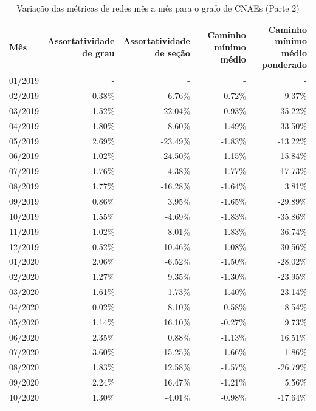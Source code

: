 \begin{table}[htb]
\centering
\caption{Variação das métricas de redes mês a mês para o grafo de CNAEs (Parte 2)}
\label{tab:metricas-redes-pandemia:grafo-mensal-por-cnae2}
\begin{tabular}{l|rrrr}
\toprule
Mês & \shortstack{Assortatividade\\de grau} & \shortstack{Assortatividade\\de seção} & \shortstack{Caminho mínimo\\médio} & \shortstack{Caminho mínimo\\médio ponderado} \\
\midrule
01/2019 & - & - & - & - \\
02/2019 &  0.38\% &  -6.76\% & -0.72\% &  -9.37\% \\
03/2019 &  1.52\% & -22.04\% & -0.93\% &  35.22\% \\
04/2019 &  1.80\% &  -8.60\% & -1.49\% &  33.50\% \\
05/2019 &  2.69\% & -23.49\% & -1.83\% & -13.22\% \\
06/2019 &  1.02\% & -24.50\% & -1.15\% & -15.84\% \\
07/2019 &  1.76\% &   4.38\% & -1.77\% & -17.73\% \\
08/2019 &  1.77\% & -16.28\% & -1.64\% &   3.81\% \\
09/2019 &  0.86\% &   3.95\% & -1.65\% & -29.89\% \\
10/2019 &  1.55\% &  -4.69\% & -1.83\% & -35.86\% \\
11/2019 &  1.02\% &  -8.01\% & -1.83\% & -36.74\% \\
12/2019 &  0.52\% & -10.46\% & -1.08\% & -30.56\% \\
01/2020 &  2.06\% &  -6.52\% & -1.50\% & -28.02\% \\
02/2020 &  1.27\% &   9.35\% & -1.30\% & -23.95\% \\
03/2020 &  1.61\% &   1.73\% & -1.40\% & -23.14\% \\
04/2020 & -0.02\% &   8.10\% &  0.58\% &  -8.54\% \\
05/2020 &  1.14\% &  16.10\% & -0.27\% &   9.73\% \\
06/2020 &  2.35\% &   0.88\% & -1.13\% &  16.51\% \\
07/2020 &  3.60\% &  15.25\% & -1.66\% &   1.86\% \\
08/2020 &  1.83\% &  12.58\% & -1.57\% & -26.79\% \\
09/2020 &  2.24\% &  16.47\% & -1.21\% &   5.56\% \\
10/2020 &  1.30\% &  -4.01\% & -0.98\% & -17.64\% \\
\bottomrule
\end{tabular}
\fdadospesquisa
\end{table}


